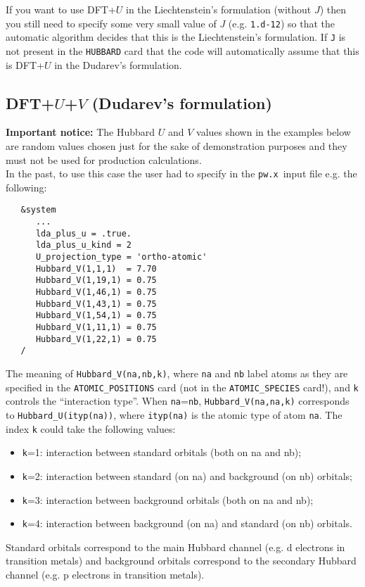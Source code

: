 \documentclass[12pt,a4paper]{article}
\def\pw{\texttt{pw.x}}
\begin{document}
\noindent
If you want to use DFT+$U$ in the Liechtenstein's formulation (without $J$) then you still need to specify some very small value of $J$ (e.g. \texttt{1.d-12}) so that the automatic algorithm decides that this is the Liechtenstein's formulation. If \texttt{J} is not present in the \texttt{HUBBARD} card that the code will automatically assume that this is DFT+$U$ in the Dudarev's formulation.

\subsection{DFT+$U$+$V$ (Dudarev's formulation)}

\textbf{Important notice:} The Hubbard $U$ and $V$ values shown in the examples below are random values chosen just for the sake of demonstration purposes and they must not be used for production calculations.\\ 

\noindent
In the past, to use this case the user had to specify in the \pw\ input file e.g. the following:
%
\noindent
\begin{verbatim}
   &system
      ...
      lda_plus_u = .true.
      lda_plus_u_kind = 2
      U_projection_type = 'ortho-atomic'
      Hubbard_V(1,1,1)  = 7.70
      Hubbard_V(1,19,1) = 0.75
      Hubbard_V(1,46,1) = 0.75
      Hubbard_V(1,43,1) = 0.75
      Hubbard_V(1,54,1) = 0.75
      Hubbard_V(1,11,1) = 0.75
      Hubbard_V(1,22,1) = 0.75
   /
\end{verbatim}
%
The meaning of \texttt{Hubbard\_V(na,nb,k)}, where \texttt{na} and \texttt{nb} label atoms as they are specified in the \texttt{ATOMIC\_POSITIONS} card (not in the \texttt{ATOMIC\_SPECIES} card!), and \texttt{k} controls the ``interaction type''. When \texttt{na}=\texttt{nb}, \texttt{Hubbard\_V(na,na,k)} corresponds to \texttt{Hubbard\_U(ityp(na))}, where \texttt{ityp(na)} is the atomic type of atom \texttt{na}. The index \texttt{k} could take the following values:
\begin{itemize}
    \item \texttt{k}=1: interaction between standard orbitals (both on na and nb);
    \item \texttt{k}=2: interaction between standard (on na) and background (on nb) orbitals;
    \item \texttt{k}=3: interaction between background orbitals (both on na and nb);
    \item \texttt{k}=4: interaction between background (on na) and standard (on nb) orbitals.
\end{itemize}
Standard orbitals correspond to the main Hubbard channel (e.g. d electrons in transition metals) and background orbitals correspond to the secondary Hubbard channel (e.g. p electrons in transition metals).\\
\end{document}
